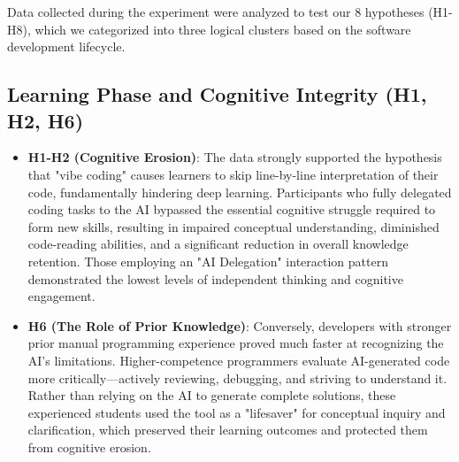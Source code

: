 \documentclass[../main.tex]{subfiles}
\begin{document}
Data collected during the experiment were analyzed to test our 8 hypotheses (H1-H8), 
which we categorized into three logical clusters based on the software development lifecycle.

\subsection{Learning Phase and Cognitive Integrity (H1, H2, H6)}
\begin{itemize}
    \item \textbf{H1-H2 (Cognitive Erosion)}: The data strongly supported the hypothesis that "vibe coding" causes learners to skip line-by-line interpretation of their code, 
    fundamentally hindering deep learning. Participants who fully delegated coding tasks to the AI bypassed the essential cognitive struggle required to form new skills, 
    resulting in impaired conceptual understanding, diminished code-reading abilities, and a significant reduction in overall knowledge retention. 
    Those employing an "AI Delegation" interaction pattern demonstrated the lowest levels of independent thinking and cognitive engagement. \cite{shen2026how}
    \item \textbf{H6 (The Role of Prior Knowledge)}: Conversely, developers with stronger prior manual programming experience proved much faster at recognizing the AI's limitations. 
    Higher-competence programmers evaluate AI-generated code more critically—actively reviewing, debugging, and striving to understand it. Rather than relying on the AI to 
    generate complete solutions, these experienced students used the tool as a "lifesaver" for conceptual inquiry and clarification, which preserved their learning outcomes 
    and protected them from cognitive erosion. \cite{kusper2025we} \cite{shen2026how}
\end{itemize}
\end{document}

